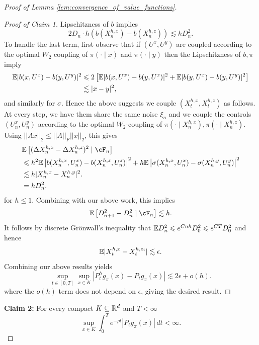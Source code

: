 \begin{proof}[Proof of Lemma \ref{lem:convergence_of_value_functions}]
\begin{proof}[Proof of Claim 1]
		\noindent Lipschitzness of $b$ implies
		\[2 D_n \cdot h\left(b(X^{h,x}_n) - b(X^{h,z}_n)\right) \lesssim h D_n^2.\]
		\noindent To handle the last term, first observe that if $(U^x, U^y)$ are coupled according to the optimal $W_2$ coupling of $\pi(\cdot \mid x)$ and $\pi(\cdot \mid y)$ then
		the Lipschitzness of $b, \pi$ imply
		\begin{align*}
			\mathbb{E}|b(x, U^x) - b(y, U^y)|^2 & \leqslant 2 \left[\mathbb{E}|b(x, U^x) - b(y, U^x)|^2 + \mathbb{E} |b(y, U^x) - b(y, U^y)|^2\right] \\
			& \lesssim |x-y|^2,
		\end{align*}
		\noindent and similarly for $\sigma$. Hence the above suggests we couple $(X_t^{h,x}, X_t^{h,z})$ as follows. At every step, we have them share the same noise $\xi_n$ and
		we couple the controls $(U_n^x, U_n^y)$ according to the optimal $W_2$-coupling of $\pi(\cdot \mid X_n^{h,x}), \pi(\cdot \mid X_n^{h,z})$. Using $||Ax||_2 \leq ||A||_F ||x||_2$, this gives
		\begin{align*}
			& \E\left[(\Delta X^{h,x}_n - \Delta X^{h,z}_n)^2 \mid \cF_n\right]\\
			& \leq h^2 \E \left|b(X_n^{h,x}, U_n^x) - b(X_n^{h,z}, U_n^z)\right|^2 + h \E \left|\sigma(X_n^{h,x}, U_n^x) - \sigma(X_n^{h,y}, U_n^y) \right|^2 \\
			& \lesssim h|X_n^{h,x} -X_n^{h,y}|^2.\\
			& = hD_n^2.
		\end{align*}
		\noindent for $h \leq 1$. Combining with our above work, this implies
		\[\E \left[D_{n+1}^2 - D_n^2 \mid \cF_n\right] \lesssim h.\]
		\noindent It follows by discrete Gr\"onwall's inequality that $\mathbb{E} D_n^2 \leqslant e^{C nh} D_0^2 \leqslant e^{CT}D_0^2$ and hence
		\[\mathbb{E}| X^{h,x}_t -  X^{h, z_i}_t| \lesssim \epsilon.\]
		\noindent Combining our above results yields
		\[\sup_{t\in[0,T]} \sup_{x \in K}|P_t^h g_\pi(x) - P_t g_\pi(x)| \lesssim 2\epsilon + o(h). \]
		\noindent where the $o(h)$ term does not depend on $\epsilon$,  giving the desired result.
	\end{proof}

	\noindent \textbf{Claim 2:} For every compact $K \subseteq \mathbb{R}^d$ and $T<\infty$
			\[
		\sup_{x \in K}\int_0^T e^{-\rho t} |P_t g_\pi(x)|\,dt < \infty.
		\]


\end{proof}
